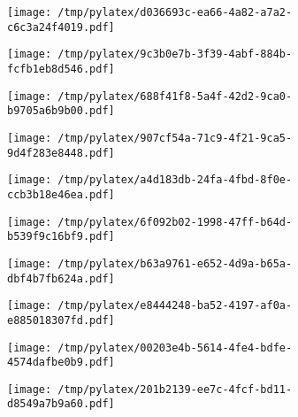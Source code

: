 \documentclass{article}
\begin{document}
\begin{figure}[htbp]
\begin{subfigure}[b]{.3\linewidth}
\texttt{[image: /tmp/pylatex/d036693c-ea66-4a82-a7a2-c6c3a24f4019.pdf]}
\end{subfigure}
\begin{subfigure}[b]{.3\linewidth}
\texttt{[image: /tmp/pylatex/9c3b0e7b-3f39-4abf-884b-fcfb1eb8d546.pdf]}
\end{subfigure}
\begin{subfigure}[b]{.3\linewidth}
\texttt{[image: /tmp/pylatex/688f41f8-5a4f-42d2-9ca0-b9705a6b9b00.pdf]}
\end{subfigure}
\begin{subfigure}[b]{.3\linewidth}
\texttt{[image: /tmp/pylatex/907cf54a-71c9-4f21-9ca5-9d4f283e8448.pdf]}
\end{subfigure}
\begin{subfigure}[b]{.3\linewidth}
\texttt{[image: /tmp/pylatex/a4d183db-24fa-4fbd-8f0e-ccb3b18e46ea.pdf]}
\end{subfigure}
\begin{subfigure}[b]{.3\linewidth}
\texttt{[image: /tmp/pylatex/6f092b02-1998-47ff-b64d-b539f9c16bf9.pdf]}
\end{subfigure}
\begin{subfigure}[b]{.3\linewidth}
\texttt{[image: /tmp/pylatex/b63a9761-e652-4d9a-b65a-dbf4b7fb624a.pdf]}
\end{subfigure}
\begin{subfigure}[b]{.3\linewidth}
\texttt{[image: /tmp/pylatex/e8444248-ba52-4197-af0a-e885018307fd.pdf]}
\end{subfigure}
\begin{subfigure}[b]{.3\linewidth}
\texttt{[image: /tmp/pylatex/00203e4b-5614-4fe4-bdfe-4574dafbe0b9.pdf]}
\end{subfigure}
\begin{subfigure}[b]{.3\linewidth}
\texttt{[image: /tmp/pylatex/201b2139-ee7c-4fcf-bd11-d8549a7b9a60.pdf]}
\end{subfigure}
\end{figure}
\end{document}
